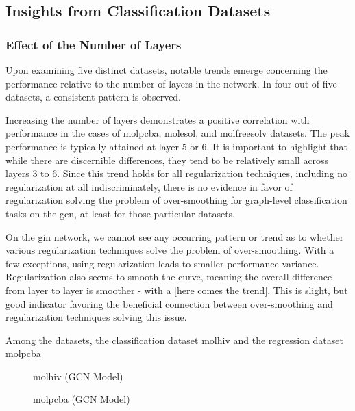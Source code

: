 \subsection{Insights from Classification Datasets}
\subsubsection{Effect of the Number of Layers}
Upon examining five distinct datasets, notable trends emerge concerning the performance relative to the number of layers in the network. In four out of five datasets, a consistent pattern is observed.

Increasing the number of layers demonstrates a positive correlation with performance in the cases of molpcba, molesol, and molfreesolv datasets. The peak performance is typically attained at layer 5 or 6. It is important to highlight that while there are discernible differences, they tend to be relatively small across layers 3 to 6. Since this trend holds for all regularization techniques, including no regularization at all indiscriminately, there is no evidence in favor of regularization solving the problem of over-smoothing for graph-level classification tasks on the \ac{gcn}, at least for those particular datasets.

On the \ac{gin} network, we cannot see any occurring pattern or trend as to whether various regularization techniques solve the problem of over-smoothing. With a few exceptions, using regularization leads to smaller performance variance. Regularization also seems to smooth the curve, meaning the overall difference from layer to layer is smoother - with a [here comes the trend]. This is slight, but
good indicator favoring the beneficial connection between over-smoothing and regularization techniques solving this issue.



Among the datasets, the classification dataset molhiv and the regression dataset molpcba



\begin{figure}
    \centering
    \caption{molhiv (GCN Model)}
    \label{fig:gcn-molfreesolv}
\end{figure}

\begin{figure}
    \centering
    \caption{molpcba (GCN Model)}
    \label{fig:gcn-molfreesolv}
\end{figure}


